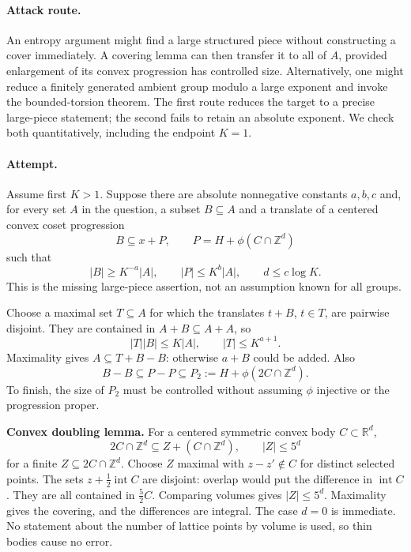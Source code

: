 \documentclass[11pt,a4paper]{article}
\newcommand{\Z}{\mathbb{Z}}
\newcommand{\R}{\mathbb{R}}
\numberwithin{equation}{section}
\begin{document}
\paragraph{Attack route.}
An entropy argument might find a large structured piece without constructing a cover immediately. A covering lemma can then transfer it to all of $A$, provided enlargement of its convex progression has controlled size. Alternatively, one might reduce a finitely generated ambient group modulo a large exponent and invoke the bounded-torsion theorem. The first route reduces the target to a precise large-piece statement; the second fails to retain an absolute exponent. We check both quantitatively, including the endpoint $K=1$.

\paragraph{Attempt.}
Assume first $K>1$. Suppose there are absolute nonnegative constants $a,b,c$ and, for every set $A$ in the question, a subset $B\subseteq A$ and a translate of a centered convex coset progression
\[
 B\subseteq x+P,\qquad P=H+\phi(C\cap\Z^d)
\]
such that
\begin{equation}\label{eq195:chunk}
 |B|\ge K^{-a}|A|,\qquad |P|\le K^b|A|,
 \qquad d\le c\log K.
\end{equation}
This is the missing large-piece assertion, not an assumption known for all groups.

Choose a maximal set $T\subseteq A$ for which the translates $t+B$, $t\in T$, are pairwise disjoint. They are contained in $A+B\subseteq A+A$, so
\[
 |T||B|\le K|A|,\qquad |T|\le K^{a+1}.
\]
Maximality gives $A\subseteq T+B-B$: otherwise $a+B$ could be added. Also
\[
 B-B\subseteq P-P\subseteq P_2:=H+\phi(2C\cap\Z^d).
\]
To finish, the size of $P_2$ must be controlled without assuming $\phi$ injective or the progression proper.

\textbf{Convex doubling lemma.} For a centered symmetric convex body $C\subset\R^d$,
\begin{equation}\label{eq195:convex}
 2C\cap\Z^d\subseteq Z+(C\cap\Z^d),\qquad |Z|\le5^d
\end{equation}
for a finite $Z\subseteq2C\cap\Z^d$.
Choose $Z$ maximal with $z-z'\notin C$ for distinct selected points. The sets $z+\tfrac12\operatorname{int}C$ are disjoint: overlap would put the difference in $\operatorname{int}C$. They are all contained in $\tfrac52 C$. Comparing volumes gives $|Z|\le5^d$. Maximality gives the covering, and the differences are integral. The case $d=0$ is immediate. No statement about the number of lattice points by volume is used, so thin bodies cause no error.
\end{document}

